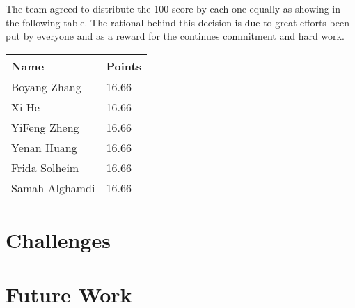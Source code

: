 \documentclass{article}
\begin{document}
The team agreed to distribute the 100 score by each one equally as showing in the following table. The rational behind this decision is due to great efforts been put by everyone and as a reward for the continues commitment and hard work.


\begin{center}
\begin{tabular}{ | m{3cm}| m{1.3cm} | }
\hline
\textbf{Name} & \textbf{Points}  \\
\hline
Boyang Zhang & 16.66  \\
\hline
Xi He & 16.66  \\
\hline
YiFeng Zheng & 16.66 \\
\hline
Yenan Huang & 16.66 \\
\hline
Frida Solheim & 16.66 \\
\hline
Samah Alghamdi & 16.66 \\
\hline
\end{tabular}
\end{center}


\section{Challenges}


\section{Future Work}
\end{document}
